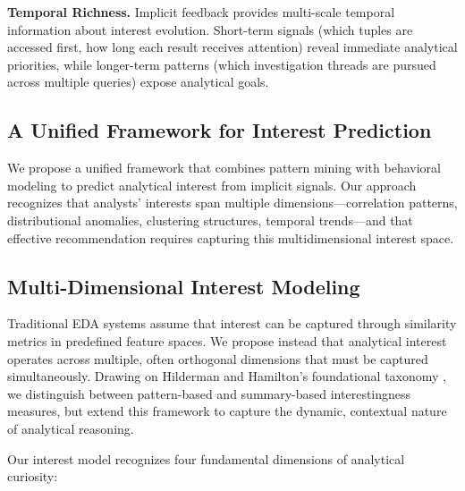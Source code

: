 \documentclass[sigconf, nonacm]{acmart}
\begin{document}
\textbf{Temporal Richness.} Implicit feedback provides multi-scale temporal information about interest evolution. Short-term signals (which tuples are accessed first, how long each result receives attention) reveal immediate analytical priorities, while longer-term patterns (which investigation threads are pursued across multiple queries) expose analytical goals. 

\subsection{A Unified Framework for Interest Prediction}

We propose a unified framework that combines pattern mining with behavioral modeling to predict analytical interest from implicit signals. Our approach recognizes that analysts' interests span multiple dimensions—correlation patterns, distributional anomalies, clustering structures, temporal trends—and that effective recommendation requires capturing this multidimensional interest space. 



\subsection{Multi-Dimensional Interest Modeling}

Traditional EDA systems assume that interest can be captured through similarity metrics in predefined feature spaces. We propose instead that analytical interest operates across multiple, often orthogonal dimensions that must be captured simultaneously. Drawing on Hilderman and Hamilton's foundational taxonomy \cite{robertj.hildermanKnowledgeDiscoveryMeasures2001}, we distinguish between pattern-based and summary-based interestingness measures, but extend this framework to capture the dynamic, contextual nature of analytical reasoning.

Our interest model recognizes four fundamental dimensions of analytical curiosity:
\end{document}
